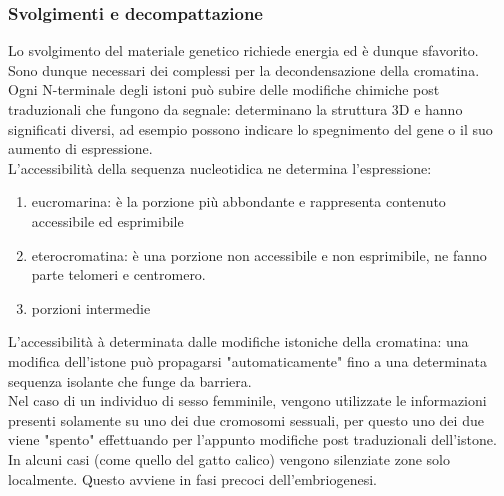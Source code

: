         \subsubsection{Svolgimenti e decompattazione}
            Lo svolgimento del materiale genetico richiede energia ed è dunque sfavorito. Sono dunque necessari dei complessi per la decondensazione della cromatina. Ogni N-terminale degli istoni può subire delle modifiche chimiche post traduzionali che fungono da segnale: determinano la struttura 3D e hanno significati diversi, ad esempio possono indicare lo spegnimento del gene o il suo aumento di espressione.\\
            L'accessibilità della sequenza nucleotidica ne determina l'espressione:
            \begin{enumerate}
                \item eucromarina: è la porzione più abbondante e rappresenta contenuto accessibile ed esprimibile
                \item eterocromatina: è una porzione non accessibile e non esprimibile, ne fanno parte telomeri e centromero.
                \item porzioni intermedie
            \end{enumerate}
            L'accessibilità à determinata dalle modifiche istoniche della cromatina: una modifica dell'istone può propagarsi "automaticamente" fino a una determinata sequenza isolante che funge da barriera.\\
            Nel caso di un individuo di sesso femminile, vengono utilizzate le informazioni presenti solamente su uno dei due cromosomi sessuali, per questo uno dei due viene "spento" effettuando per l'appunto modifiche post traduzionali dell'istone. In alcuni casi (come quello del gatto calico) vengono silenziate zone solo localmente. Questo avviene in fasi precoci dell'embriogenesi.
        
